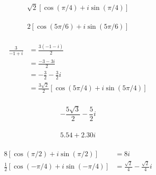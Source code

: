 \documentclass{article}
\begin{document}
\subsubsection{}

\[\sqrt{2} [\cos (\pi / 4) + i \sin (\pi / 4)]\]

\setcounter{subsubsection}{6}
\subsubsection{}

\[2 [\cos (5 \pi / 6) + i \sin (5 \pi / 6)]\]

\setcounter{subsubsection}{8}
\subsubsection{}

\begin{align*}
  \frac{3}{-1 + i} & = \frac{3 (-1 - i)}{2}                                         \\
                   & = \frac{-3 - 3 i}{2}                                           \\
                   & = -\frac{3}{2} - \frac{3}{2} i                                 \\
                   & = \frac{3 \sqrt{2}}{2} [\cos (5 \pi / 4) + i \sin (5 \pi / 4)]
\end{align*}

\setcounter{subsubsection}{10}
\subsubsection{}

\[-\frac{5 \sqrt{3}}{2} - \frac{5}{2} i\]

\setcounter{subsubsection}{12}
\subsubsection{}

\[5.54 + 2.30 i\]

\setcounter{subsubsection}{14}
\subsubsection{}

\begin{align*}
  8 [\cos (\pi / 2) + i \sin (\pi / 2)]             & = 8 i                                       \\
  \frac{1}{2} [\cos (-\pi / 4) + i \sin (-\pi / 4)] & = \frac{\sqrt{2}}{4} - \frac{\sqrt{2}}{4} i
\end{align*}
\end{document}
